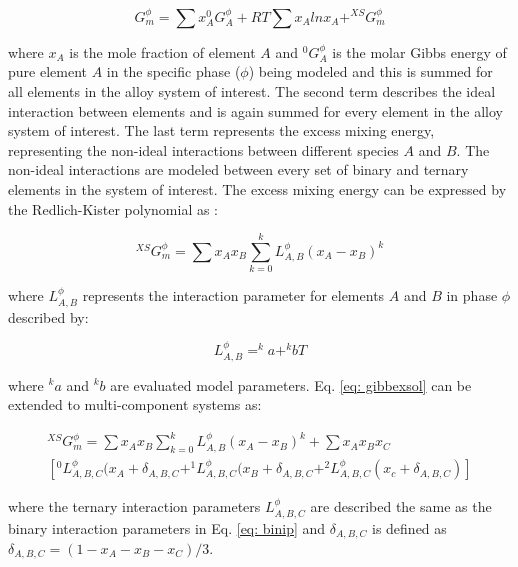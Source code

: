 \begin{equation}
\label{eq: gibbssolution}
G_m^{\phi} = \sum x_{A} ^{0}G_{A}^{\phi} + R T \sum x_{A} ln x_{A} + ^{XS}G_{m}^{\phi}
\end{equation}

\noindent where $x_{A}$ is the mole fraction of element $A$ and $^{0}G_{A}^{\phi}$ is the molar Gibbs energy of pure element $A$ in the specific phase ($\phi$) being modeled and this is summed for all elements in the alloy system of interest. The second term describes the ideal interaction between elements and is again summed for every element in the alloy system of interest. The last term represents the excess mixing energy, representing the non-ideal interactions between different species $A$ and $B$. The non-ideal interactions are modeled between every set of binary and ternary elements in the system of interest. The excess mixing energy can be expressed by the Redlich-Kister polynomial as \cite{Redlich1948b}: 

\begin{equation}
\label{eq: gibbexsol}
^{XS}G_m^{\phi} = \sum x_{A} x_{B} \sum_{k=0} ^{k}L_{A,B}^{\phi} (x_{A} - x_{B})^k
\end{equation}

\noindent where $L_{A,B}^{\phi}$ represents the interaction parameter for elements $A$ and $B$ in phase $\phi$ described by:

\begin{equation}
\label{eq: binip}
L_{A,B}^{\phi} = ^{k}a + ^{k}bT
\end{equation}

\noindent where $^{k}a$ and $^{k}b$ are evaluated model parameters. Eq. \ref{eq: gibbexsol} can be extended to multi-component systems as:

\begin{multline}
\label{eq: gibbexsolmulti}
^{XS}G_m^{\phi} = \sum x_{A} x_{B} \sum_{k=0} ^{k}L_{A,B}^{\phi} (x_{A} - x_{B})^k + \sum x_{A} x_{B} x_{C} \\ \left[ ^{0}L_{A, B, C}^{\phi} (x_{A} + \delta_{A, B, C} + ^{1}L_{A, B, C}^{\phi} (x_{B} + \delta_{A, B, C} + ^{2}L_{A, B, C}^{\phi} (x_{c} + \delta_{A, B, C} ) \right]
\end{multline}

\noindent where the ternary interaction parameters $L_{A, B, C}^{\phi}$ are described the same as the binary interaction parameters in Eq. \ref{eq: binip} and $\delta_{A, B, C}$ is defined as $\delta_{A, B, C} = ( 1 - x_{A} - x_{B} - x_{C})/3$.

